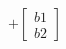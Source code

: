 \documentclass[preview]{standalone}
\begin{document}
\begin{align*}
+ \begin{bmatrix} b1 \\ b2 \end{bmatrix}
\end{align*}
\end{document}

